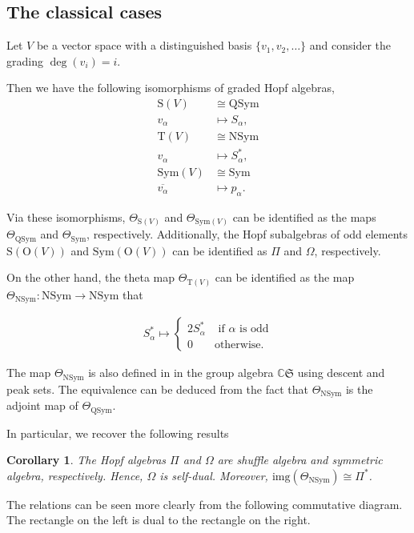 \documentclass[12pt]{amsart}
\newtheorem{corollary}[theorem]{Corollary}
\numberwithin{equation}{section}
\newcommand{\NSym}{\mathrm{NSym}}
\newcommand{\QSym}{\mathrm{QSym}}
\newcommand{\Sym}{\mathrm{Sym}}
\newcommand{\rmO}{\mathrm{O}}
\newcommand{\rmT}{\mathrm{T}}
\newcommand{\rmS}{\mathrm{S}}
\newcommand{\img}{\mathrm{img}}
\begin{document}
\subsection{The classical cases}
Let $V$ be a vector space with a distinguished basis $\{v_1,v_2,\dots\}$ and consider the grading $\deg(v_i)=i$.

Then we have the following isomorphisms of graded Hopf algebras,
\begin{align*}
	\rmS(V)&\cong\QSym\\
	v_\alpha&\mapsto S_\alpha,\\
	\rmT(V)&\cong\NSym\\
	v_\alpha&\mapsto S_\alpha^*,\\
	\Sym(V)&\cong\Sym\\
	\overline{v_\alpha}&\mapsto p_\alpha.
\end{align*}

Via these isomorphisms, $\Theta_{\rmS(V)}$ and $\Theta_{\Sym(V)}$ can be identified as the maps $\Theta_\QSym$ and $\Theta_\Sym$, respectively. Additionally, the Hopf subalgebras of odd elements $\rmS(\rmO(V))$ and $\Sym(\rmO(V))$ can be identified as $\Pi$ and $\Omega$, respectively.

On the other hand, the theta map $\Theta_{\rmT(V)}$ can be identified as the map $\Theta_\NSym:\NSym\to\NSym$ that

\begin{align*}
	S_\alpha^* \mapsto \left\{\begin{array}{cc}
		2 S_\alpha^*&\text{ if }\alpha\text{ is odd}\\
		0&\text{otherwise.}
	\end{array}\right.
\end{align*}

The map $\Theta_\NSym$ is also defined in \cite{N03,S05} in the group algebra $\mathbb{C}\mathfrak{S}$ using descent and peak sets. The equivalence can be deduced from the fact that $\Theta_\NSym$ is the adjoint map of $\Theta_\QSym$.

In particular, we recover the following results

\begin{corollary}
	The Hopf algebras $\Pi$ and $\Omega$ are shuffle algebra and symmetric algebra, respectively. Hence, $\Omega$ is self-dual. Moreover, $\img(\Theta_\NSym)\cong\Pi^*$.
\end{corollary}

The relations can be seen more clearly from the following commutative diagram. The rectangle on the left is dual to the rectangle on the right.
\end{document}
